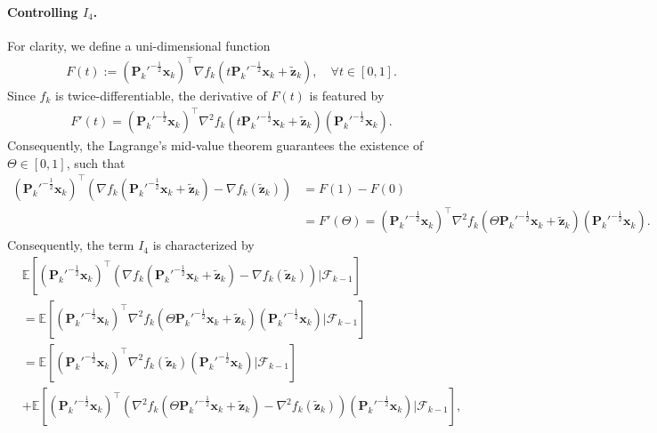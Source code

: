 \paragraph{Controlling $I_4$.} For clarity, we define a uni-dimensional function
\begin{align*}
F(t) := (\bm{P}_k'^{-\frac{1}{2}}\bm{x}_k)^\top \nabla f_k(t\bm{P}_k'^{-\frac{1}{2}}\bm{x}_k + \tilde{\bm{z}}_k), \quad \forall t \in [0,1].
\end{align*}
Since $f_k$ is twice-differentiable, the derivative of $F(t)$ is featured by
\begin{align*}
F'(t) = (\bm{P}_k'^{-\frac{1}{2}}\bm{x}_k)^\top \nabla^2 f_k(t\bm{P}_k'^{-\frac{1}{2}}\bm{x}_k + \tilde{\bm{z}}_k) (\bm{P}_k'^{-\frac{1}{2}}\bm{x}_k).
\end{align*}
Consequently, the Lagrange's mid-value theorem guarantees the existence of $\Theta  \in [0,1]$, such that
\begin{align*}
(\bm{P}_k'^{-\frac{1}{2}}\bm{x}_k)^\top \left(\nabla f_k(\bm{P}_k'^{-\frac{1}{2}}\bm{x}_k + \tilde{\bm{z}}_k)- \nabla f_k(\tilde{\bm{z}}_k) \right) 
&= F(1) - F(0) \\ 
&= F'(\Theta) = (\bm{P}_k'^{-\frac{1}{2}}\bm{x}_k)^\top \nabla^2 f_k(\Theta\bm{P}_k'^{-\frac{1}{2}}\bm{x}_k + \tilde{\bm{z}}_k) (\bm{P}_k'^{-\frac{1}{2}}\bm{x}_k).
\end{align*}
Consequently, the term $I_4$ is characterized by
\begin{align}\label{eq:Srikant-I4}
&\mathbb{E}\left[(\bm{P}_k'^{-\frac{1}{2}}\bm{x}_k)^\top \left(\nabla f_k(\bm{P}_k'^{-\frac{1}{2}}\bm{x}_k + \tilde{\bm{z}}_k)- \nabla f_k(\tilde{\bm{z}}_k) \right)\bigg|\mathscr{F}_{k-1}\right]\nonumber \\ 
&=\mathbb{E}\left[(\bm{P}_k'^{-\frac{1}{2}}\bm{x}_k)^\top \nabla^2f_k(\Theta \bm{P}_k'^{-\frac{1}{2}}\bm{x}_k + \tilde{\bm{z}}_k)(\bm{P}_k'^{-\frac{1}{2}}\bm{x}_k) \bigg|\mathscr{F}_{k-1}\right]\nonumber \\
&= \mathbb{E}\left[(\bm{P}_k'^{-\frac{1}{2}}\bm{x}_k)^\top \nabla^2f_k(\tilde{\bm{z}}_k)(\bm{P}_k'^{-\frac{1}{2}}\bm{x}_k) \bigg|\mathscr{F}_{k-1}\right] \nonumber \\ 
&+ \mathbb{E}\left[(\bm{P}_k'^{-\frac{1}{2}}\bm{x}_k)^\top (\nabla^2f_k(\Theta \bm{P}_k'^{-\frac{1}{2}}\bm{x}_k + \tilde{\bm{z}}_k) - \nabla^2 f_k(\tilde{\bm{z}}_k))(\bm{P}_k'^{-\frac{1}{2}}\bm{x}_k) \bigg|\mathscr{F}_{k-1}\right],
\end{align}
